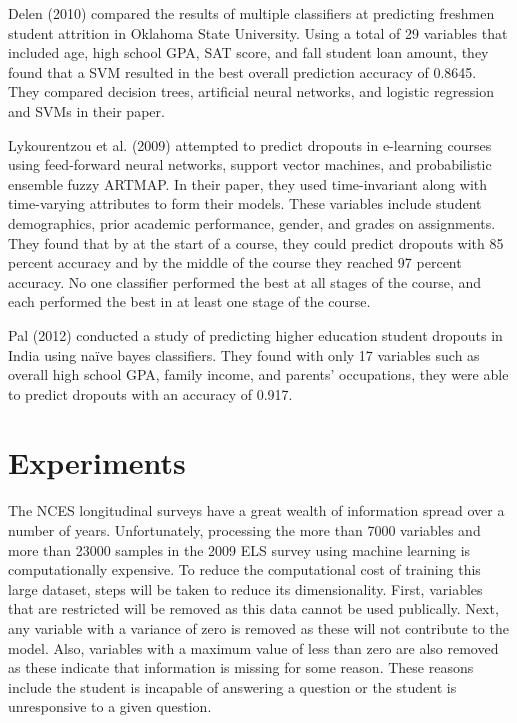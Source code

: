 \documentclass[twoside,11pt]{article}
\begin{document}
Delen (2010) \nocite{Delen:2010} compared the results of multiple classifiers
at predicting freshmen student attrition in Oklahoma State University.  Using a
total of 29 variables that included age, high school GPA, SAT score, and fall
student loan amount, they found that a SVM resulted in the best overall
prediction accuracy of 0.8645.  They compared decision trees, artificial neural
networks, and logistic regression and SVMs in their paper.

Lykourentzou et al. (2009) \nocite{Lykourentzou:2009} attempted to predict
dropouts in e-learning courses using feed-forward neural networks, support
vector machines, and probabilistic ensemble fuzzy ARTMAP.  In their paper, they
used time-invariant along with time-varying attributes to form their models.
These variables include student demographics, prior academic performance,
gender, and grades on assignments.  They found that by at the start of a
course, they could predict dropouts with 85 percent accuracy and by the middle
of the course they reached 97 percent accuracy.  No one classifier performed
the best at all stages of the course, and each performed the best in at least
one stage of the course.

Pal (2012) \nocite{Pal:2012} conducted a study of predicting higher education
student dropouts in India using naïve bayes classifiers.  They found with only
17 variables such as overall high school GPA, family income, and parents'
occupations, they were able to predict dropouts with an accuracy of 0.917. 


\section{Experiments}

The NCES longitudinal surveys have a great wealth of information spread over a
number of years.  Unfortunately, processing the more than 7000 variables and
more than 23000 samples in the 2009 ELS survey using machine learning is
computationally expensive.  To reduce the computational cost of training this
large dataset, steps will be taken to reduce its dimensionality.  First,
variables that are restricted will be removed as this data cannot be used
publically.  Next, any variable with a variance of zero is removed as these
will not contribute to the model.  Also, variables with a maximum value of less
than zero are also removed as these indicate that information is missing for
some reason.  These reasons include the student is incapable of answering a
question or the student is unresponsive to a given question.
\end{document}
